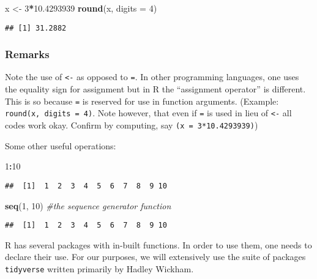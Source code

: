 \documentclass[11pt,]{article}
\newenvironment{Shaded}{\begin{snugshade}}{\end{snugshade}}
\newcommand{\KeywordTok}[1]{\textcolor[rgb]{0.13,0.29,0.53}{\textbf{#1}}}
\newcommand{\DataTypeTok}[1]{\textcolor[rgb]{0.13,0.29,0.53}{#1}}
\newcommand{\DecValTok}[1]{\textcolor[rgb]{0.00,0.00,0.81}{#1}}
\newcommand{\FloatTok}[1]{\textcolor[rgb]{0.00,0.00,0.81}{#1}}
\newcommand{\StringTok}[1]{\textcolor[rgb]{0.31,0.60,0.02}{#1}}
\newcommand{\CommentTok}[1]{\textcolor[rgb]{0.56,0.35,0.01}{\textit{#1}}}
\newcommand{\OperatorTok}[1]{\textcolor[rgb]{0.81,0.36,0.00}{\textbf{#1}}}
\newcommand{\NormalTok}[1]{#1}
\begin{document}
\begin{Shaded}
\begin{Highlighting}[]
\NormalTok{x <-}\StringTok{ }\DecValTok{3}\OperatorTok{*}\FloatTok{10.4293939}
\KeywordTok{round}\NormalTok{(x, }\DataTypeTok{digits =} \DecValTok{4}\NormalTok{)}
\end{Highlighting}
\end{Shaded}

\begin{verbatim}
## [1] 31.2882
\end{verbatim}

\subsubsection{Remarks}\label{remarks}

Note the use of \texttt{\textless{}-} as opposed to \texttt{=}. In other
programming languages, one uses the equality sign for assignment but in
R the ``assignment operator'' is different. This is so because
\texttt{=} is reserved for use in function arguments. (Example:
\texttt{round(x,\ digits\ =\ 4)}. Note however, that even if \texttt{=}
is used in lieu of \texttt{\textless{}-} all codes work okay. Confirm by
computing, say \texttt{(x\ =\ 3*10.4293939)})

Some other useful operations:

\begin{Shaded}
\begin{Highlighting}[]
\DecValTok{1}\OperatorTok{:}\DecValTok{10}
\end{Highlighting}
\end{Shaded}

\begin{verbatim}
##  [1]  1  2  3  4  5  6  7  8  9 10
\end{verbatim}

\begin{Shaded}
\begin{Highlighting}[]
\KeywordTok{seq}\NormalTok{(}\DecValTok{1}\NormalTok{, }\DecValTok{10}\NormalTok{) }\CommentTok{#the sequence generator function}
\end{Highlighting}
\end{Shaded}

\begin{verbatim}
##  [1]  1  2  3  4  5  6  7  8  9 10
\end{verbatim}

R has several packages with in-built functions. In order to use them,
one needs to declare their use. For our purposes, we will extensively
use the suite of packages \texttt{tidyverse} written primarily by Hadley
Wickham.
\end{document}
